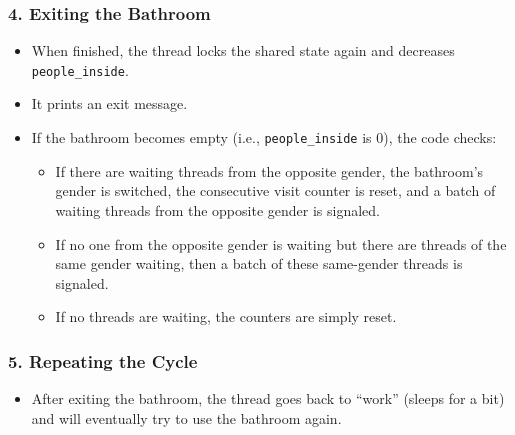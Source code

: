 \documentclass[a4paper,11pt]{article}
\begin{document}
\subsubsection*{4. Exiting the Bathroom}
\begin{itemize}[noitemsep]
    \item When finished, the thread locks the shared state again and decreases \texttt{people\_inside}.
    \item It prints an exit message.
    \item If the bathroom becomes empty (i.e., \texttt{people\_inside} is 0), the code checks:
    \begin{itemize}[noitemsep]
        \item If there are waiting threads from the opposite gender, the bathroom’s gender is switched, the consecutive visit counter is reset, and a batch of waiting threads from the opposite gender is signaled.
        \item If no one from the opposite gender is waiting but there are threads of the same gender waiting, then a batch of these same-gender threads is signaled.
        \item If no threads are waiting, the counters are simply reset.
    \end{itemize}
\end{itemize}

\subsubsection*{5. Repeating the Cycle}
\begin{itemize}[noitemsep]
    \item After exiting the bathroom, the thread goes back to “work” (sleeps for a bit) and will eventually try to use the bathroom again.
\end{itemize}
\end{document}
